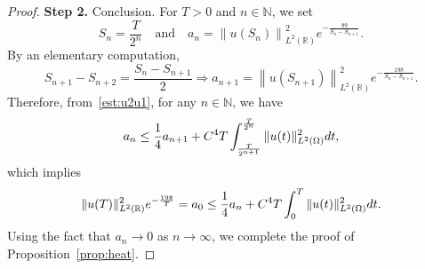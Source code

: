 \documentclass[a4paper,reqno]{amsart}
\theoremstyle{definition}
\numberwithin{equation}{section}
\newcommand{\R}{\mathbb{R}}
\def \R {{\mathbb{R} }}
\def \d {{\rm{d}}}
\begin{document}
\begin{proof}
    \smallskip
    \textbf{Step 2.} Conclusion. For $T>0$ and $n\in \mathbb{N}$, we set
    \begin{equation*}
        S_{n}=\frac{T}{2^{n}}\quad \mbox{and}\quad
        a_{n}=\left\|u(S_{n})\right\|_{L^{2}(\R)}^{2}e^{-\frac{99}{S_{n}-S_{n+1}}}.
        \end{equation*}
        By an elementary computation,
        \begin{equation*}
          S_{n+1}-S_{n+2} = \frac{S_{n}-S_{n+1}}{2}
          \Longrightarrow 
          a_{n+1}=\left\|u(S_{n+1})\right\|_{L^{2}(\R)}^{2}e^{-\frac{198}{S_{n}-S_{n+1}}}.
          \end{equation*}
          Therefore, from~\eqref{est:u2u1}, for any $n\in \mathbb{N}$, we have
          \begin{equation*}
              a_{n}\le \frac{1}{4}a_{n+1}+C^{4}T\int_{\frac{T}{2^{n+1}}}^{\frac{T}{2^{n}}}\|u(t)\|_{L^{2}(\Omega)}^{2}\d t,
          \end{equation*}
          which implies 
          \begin{equation*}
         \|u(T)\|_{L^{2}(\R)}^{2}e^{-\frac{198}{T}} =    a_{0}\le \frac{1}{4}a_{n}+C^{4}T\int_{0}^{T}\|u(t)\|_{L^{2}(\Omega)}^{2}\d t.
          \end{equation*}
          Using the fact that $a_{n}\to 0$ as $n\to\infty$, we complete the proof of Proposition~\ref{prop:heat}.
    \end{proof}
\end{document}
